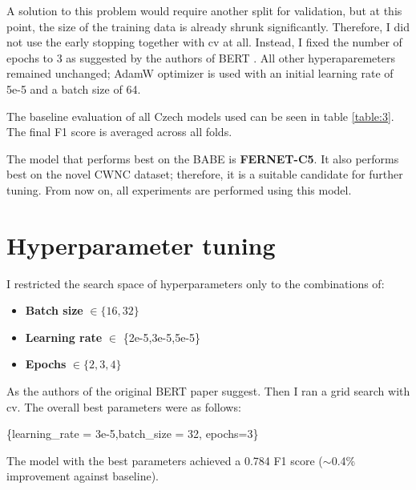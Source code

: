  A solution to this problem would require another split for validation, but at this point, the size of the training data is already shrunk significantly. Therefore, I did not use the early stopping together with \gls{cv} at all. Instead, I fixed the number of epochs to 3 as suggested by the authors of BERT \cite{devlin2019bert} . 
 All other hyperaparemeters remained unchanged; AdamW optimizer is used with an initial learning rate of 5e-5 and a batch size of 64.
 
 The baseline evaluation of all Czech models used can be seen in table \ref{table:3}. The final F1 score is averaged across all folds.
 
 The model that performs best on the BABE is \textbf{FERNET-C5}. It also performs best on the novel CWNC dataset; therefore, it is a suitable candidate for further tuning. From now on, all experiments are performed using this model.
 

 

 
 
 
 
\newpage

 \section{Hyperparameter tuning}
I restricted the search space of hyperparameters only to the combinations of:
 \begin{itemize}
     \item \textbf{Batch size} $\in \{16,32\}$
     \item \textbf{Learning rate} $\in $ \{2e-5,3e-5,5e-5\}
     \item \textbf{Epochs} $\in \{2,3,4\}$
 \end{itemize}
 
 As the authors of the original BERT paper suggest. Then I ran a grid search with \gls{cv}. The overall best parameters were as follows:
 \begin{center}
      \{learning\_rate = 3e-5,batch\_size = 32, epochs=3\}\label{hyperparams}
 \end{center}
 
 The model with the best parameters achieved a 0.784 F1 score ($\sim$0.4\% improvement against baseline).


 
 






